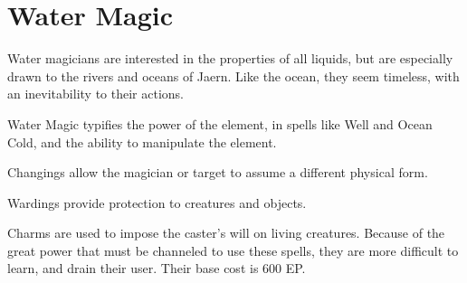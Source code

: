 \chapter{Water Magic}
\label{ch:elemental-water-magic}

Water magicians are interested in the properties of all liquids, but are especially drawn to the rivers and oceans of Jaern.
Like the ocean, they seem timeless, with an inevitability to their actions.

Water Magic typifies the power of the element, in spells like Well and Ocean Cold, and the ability to manipulate the element.

Changings allow the magician or target to assume a different physical form.

Wardings provide protection to creatures and objects.

Charms are used to impose the caster's will on living creatures. Because of the great power that must be channeled to use these spells, they are more difficult to learn, and drain their user. Their base cost is 600 EP.

